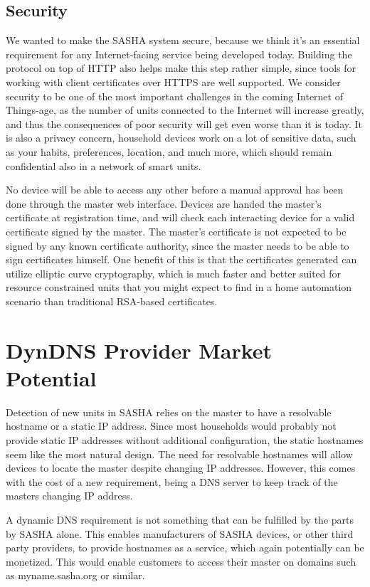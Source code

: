 \subsection{Security}
We wanted to make the SASHA system secure, because we think it’s an essential requirement for any Internet-facing service being developed today. Building the protocol on top of HTTP also helps make this step rather simple, since tools for working with client certificates over HTTPS are well supported. We consider security to be one of the most important challenges in the coming Internet of Things-age, as the number of units connected to the Internet will increase greatly, and thus the consequences of poor security will get even worse than it is today. It is also a privacy concern, household devices work on a lot of sensitive data, such as your habits, preferences, location, and much more, which should remain confidential also in a network of smart units.

No device will be able to access any other before a manual approval has been done through the master web interface. Devices are handed the master’s certificate at registration time, and will check each interacting device for a valid certificate signed by the master. The master’s certificate is not expected to be signed by any known certificate authority, since the master needs to be able to sign certificates himself. One benefit of this is that the certificates generated can utilize elliptic curve cryptography, which is much faster and better suited for resource constrained units that you might expect to find in a home automation scenario than traditional RSA-based certificates.

\section{DynDNS Provider Market Potential}
Detection of new units in SASHA relies on the master to have a resolvable hostname or a static IP address. Since most households would probably not provide static IP addresses without additional configuration, the static hostnames seem like the most natural design.
The need for resolvable hostnames will allow devices to locate the master despite changing IP addresses. However, this comes with the cost of a new requirement, being a DNS server to keep track of the masters changing IP address.

A dynamic DNS requirement is not something that can be fulfilled by the parts by SASHA alone. This enables manufacturers of SASHA devices, or other third party providers, to provide hostnames as a service, which again potentially can be monetized. This would enable customers to access their master on domains such as myname.sasha.org or similar.


